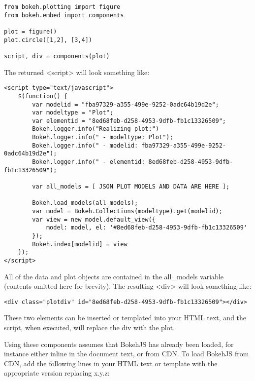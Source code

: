 \begin{framed}
\begin{verbatim}
from bokeh.plotting import figure
from bokeh.embed import components

plot = figure()
plot.circle([1,2], [3,4])

script, div = components(plot)
\end{verbatim}
\end{framed}
The returned <script> will look something like:
\begin{framed}
	\begin{verbatim}
<script type="text/javascript">
    $(function() {
        var modelid = "fba97329-a355-499e-9252-0adc64b19d2e";
        var modeltype = "Plot";
        var elementid = "8ed68feb-d258-4953-9dfb-fb1c13326509";
        Bokeh.logger.info("Realizing plot:")
        Bokeh.logger.info(" - modeltype: Plot");
        Bokeh.logger.info(" - modelid: fba97329-a355-499e-9252-0adc64b19d2e");
        Bokeh.logger.info(" - elementid: 8ed68feb-d258-4953-9dfb-fb1c13326509");

        var all_models = [ JSON PLOT MODELS AND DATA ARE HERE ];

        Bokeh.load_models(all_models);
        var model = Bokeh.Collections(modeltype).get(modelid);
        var view = new model.default_view({
            model: model, el: '#8ed68feb-d258-4953-9dfb-fb1c13326509'
        });
        Bokeh.index[modelid] = view
    });
</script>
\end{verbatim}
\end{framed}

All of the data and plot objects are contained in the all_models variable (contents omitted here for brevity). The resulting <div> will look something like:
\begin{verbatim}
<div class="plotdiv" id="8ed68feb-d258-4953-9dfb-fb1c13326509"></div>
\end{verbatim}

These two elements can be inserted or templated into your HTML text, and the script, when executed, will replace the div with the plot.

Using these components assumes that BokehJS has already been loaded, for instance either inline in the document text, or from CDN. To load BokehJS from CDN, add the following lines in your HTML text or template with the appropriate version replacing x.y.z:

